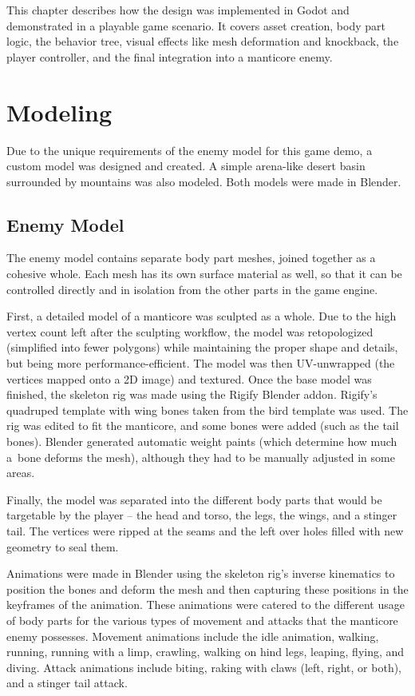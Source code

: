 This chapter describes how the design was implemented in Godot and demonstrated in a playable game scenario. It covers asset creation, body part logic, the behavior tree, visual effects like mesh deformation and knockback, the player controller, and the final integration into a manticore enemy.


\section{Modeling}
Due to the unique requirements of the enemy model for this game demo, a custom model was designed and created. A simple arena-like desert basin surrounded by mountains was also modeled. Both models were made in Blender.

\subsection{Enemy Model}
The enemy model contains separate body part meshes, joined together as a cohesive whole. Each mesh has its own surface material as well, so that it can be controlled directly and in isolation from the other parts in the game engine.

First, a detailed model of a manticore was sculpted as a whole.
Due to the high vertex count left after the sculpting workflow, the model was retopologized (simplified into fewer polygons) while maintaining the proper shape and details, but being more performance-efficient.
The model was then UV-unwrapped (the vertices mapped onto a 2D image) and textured.
Once the base model was finished, the skeleton rig was made using the Rigify Blender addon. Rigify's quadruped template with wing bones taken from the bird template was used. The rig was edited to fit the manticore, and some bones were added (such as the tail bones). Blender generated automatic weight paints (which determine how much a~bone deforms the mesh), although they had to be manually adjusted in some areas.

Finally, the model was separated into the different body parts that would be targetable by the player -- the head and torso, the legs, the wings, and a stinger tail. The vertices were ripped at the seams and the left over holes filled with new geometry to seal them.

Animations were made in Blender using the skeleton rig's inverse kinematics to position the bones and deform the mesh and then capturing these positions in the keyframes of the animation. These animations were catered to the different usage of body parts for the various types of movement and attacks that the manticore enemy possesses.
Movement animations include the idle animation, walking, running, running with a limp, crawling, walking on hind legs, leaping, flying, and diving.
Attack animations include biting, raking with claws (left, right, or both), and a stinger tail attack.

